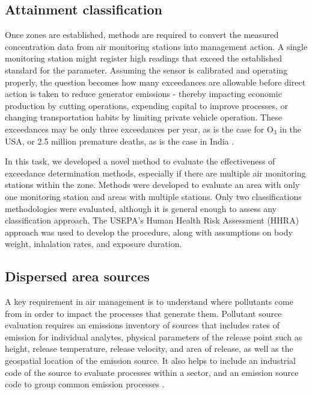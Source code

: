 \subsection{Attainment classification}

Once zones are established, methods are required to convert the measured concentration data from air monitoring stations into management action. A single monitoring station might register high readings that exceed the established standard for the parameter. Assuming the sensor is calibrated and operating properly, the question becomes how many exceedances are allowable before direct action is taken to reduce generator emissions - thereby impacting economic production by cutting operations, expending capital to improve processes, or changing transportation habits by limiting private vehicle operation. These exceedances may be only three exceedances per year, as is the case for O$_{3}$ in the USA, or 2.5 million premature deaths, as is the case in India \citep{Landrigan2017}.

In this task, we developed a novel method to evaluate the effectiveness of exceedance determination methods, especially if there are multiple air monitoring stations within the zone. Methods were developed to evaluate an area with only one monitoring station and areas with multiple stations. Only two classifications methodologies were evaluated, although it is general enough to assess any classification approach. The USEPA's Human Health Risk Assessment (HHRA) approach was used to develop the procedure, along with assumptions on body weight, inhalation rates, and exposure duration. 

\subsection{Dispersed area sources}

A key requirement in air management is to understand where pollutants come from in order to impact the processes that generate them. Pollutant source evaluation requires an emissions inventory of sources that includes rates of emission for individual analytes, physical parameters of the release point such as height, release temperature, release velocity, and area of release, as well as the geospatial location of the emission source. It also helps to include an industrial code of the source to evaluate processes within a sector, and an emission source code to group common emission processes \citep{The2008}.

